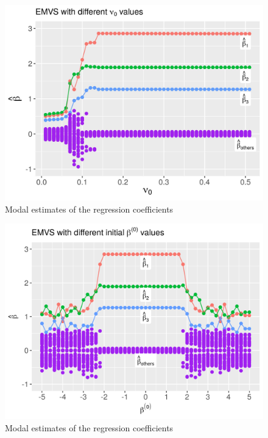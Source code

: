 \documentclass[]{book}
\begin{document}
\begin{figure}

{\centering \includegraphics[width=0.7\linewidth]{images/fig2} 

}

\caption{Modal estimates of the regression coefficients}\label{fig:fig2}
\end{figure}
\begin{figure}

{\centering \includegraphics[width=0.7\linewidth]{images/fig3} 

}

\caption{Modal estimates of the regression coefficients}\label{fig:fig3}
\end{figure}


\end{document}
